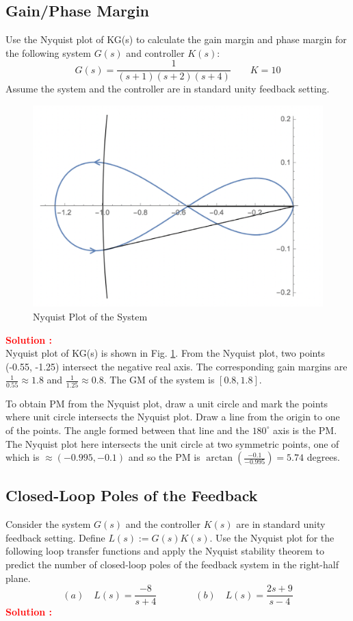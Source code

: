 \documentclass[12pt]{article}
\begin{document}
\subsection{Gain/Phase Margin}

Use the Nyquist plot of KG(s) to calculate the gain margin and phase margin for the following system $G(s)$ and controller $K(s)$:
$$G(s)=\frac{1}{(s + 1)(s + 2)(s + 4)} \qquad K=10$$
Assume the system and the controller are in standard unity feedback setting. \\

\begin{figure}[H]
    \centering
    \includegraphics[width=0.5\linewidth]{figs/8.4.png}
    \caption{Nyquist Plot of the System}
    \label{fig:prb13}
\end{figure}
\textbf{\textcolor{red}{Solution :}} \\
Nyquist plot of KG(s) is shown in Fig. \ref{fig:prb13}. From the Nyquist plot, two points (-0.55, -1.25) intersect the negative real axis. The
corresponding gain margins are $\frac{1}{0.55} \approx 1.8$ and $\frac{1}{1.25} \approx 0.8$. The GM of the system is $[0.8,1.8]$.

To obtain PM from the Nyquist plot, draw a unit circle and mark the points where unit
circle intersects the Nyquist plot. Draw a line from the origin to one of the points. The
angle formed between that line and the $180^\circ$ axis is the PM. The Nyquist plot here
intersects the unit circle at two symmetric points, one of which is $\approx(-0.995, -0.1)$ and
so the PM is $\arctan\left( \frac{-0.1}{-0.995}\right)= 5.74$ degrees.
\clearpage

\subsection{Closed-Loop Poles of the Feedback}

Consider the system $G(s)$ and the controller $K(s)$ are in standard unity feedback setting. Define $L(s) := G(s)K(s)$. Use the Nyquist plot for the following loop transfer functions and apply the Nyquist stability theorem to predict the number of closed-loop poles of the feedback system in the right-half plane.
$$(a) \quad L(s)=\frac{-8}{s+4} \qquad \qquad  (b) \quad L(s)=\frac{2s +9}{s-4}$$
\textbf{\textcolor{red}{Solution :}} \\
\end{document}

